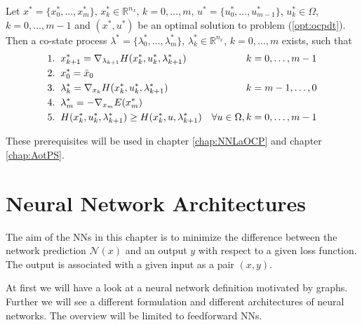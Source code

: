 \documentclass[a4paper, 12pt]{scrreprt} %
\begin{document}
\begin{myTheorem}
\label{thm:pmpdt}
Let $x^*=\{x_0^*, \dots,x_m^*\}$, $x^*_k \in \mathbb R^{n_x}$, $k = 0,\dots, m$, $u^* = \{u_0^*, \dots,u_{m-1}^*\}$, $u_k^*\in \Omega$, $k = 0, \dots, m-1$ and $(x^*,u^*)$ be an optimal solution to problem (\ref{opt:ocpdt}). Then a co-state process $\lambda^* = \{\lambda_0^*, \dots, \lambda_m^*\}$, $\lambda^*_k \in \mathbb R^{n_x}$, $k=0,\dots,m$ exists, such that
\begin{align}
1.&\hspace{0.2cm} x^*_{k+1} =  \nabla_{\lambda_{k+1}} H(x^*_k,u^*_k,\lambda^*_{k+1}) &k=0,\dots,m-1 \\
2.&\hspace{0.2cm} x^*_0 = \bar x_0 \\
3.&\hspace{0.2cm} \lambda^*_k = \nabla_{x_k} H(x^*_k,u^*_k,\lambda^*_{k+1}) & k=m-1, \dots, 0 \\
4.&\hspace{0.2cm} \lambda^*_m = - \nabla_{x_m} E(x^*_m) \\
5.&\hspace{0.2cm} H(x^*_k,u^*_k,\lambda^*_{k+1}) \geq H(x^*_k,u,\lambda^*_{k+1}) & \forall u \in \Omega, k = 0,\dots, m-1
\end{align}
\end{myTheorem}

These prerequisites will be used in chapter \ref{chap:NNLaOCP} and chapter \ref{chap:AotPS}.

\chapter{Neural Network Architectures}
\label{chap:NNA}
The aim of the \acfp{NN} in this chapter is to minimize the difference between the network prediction $\mathcal{N}(x)$ and an output $y$ with respect to a given loss function. The output is associated with a given input as a pair $(x,y)$. 

At first we will have a look at a neural network definition motivated by graphs. Further we will see a different formulation and different architectures of neural networks. The overview will be limited to feedforward \acp{NN}.
\end{document}
